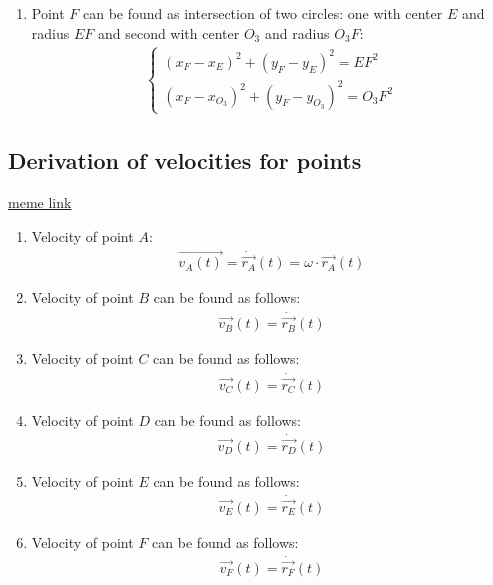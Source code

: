 \begin{enumerate}
    \item Point $F$ can be found as intersection of two circles: one with center $E$ and radius $EF$ and second with center $O_3$ and radius $O_3F$:
          \begin{align}
              \begin{cases}
                  (x_F - x_E)^2 + (y_F - y_E)^2 = EF^2 \\
                  (x_F - x_{O_3})^2 + (y_F - y_{O_3})^2 = O_3F^2
              \end{cases}
          \end{align}


\end{enumerate}

\subsection{Derivation of velocities for points}
\href{https://www.youtube.com/watch?v=l7jCZV_lIHM}{meme link}

\begin{enumerate}
    \item Velocity of point $A$:
          \begin{align}
              \vec{v_A(t)} = \dot{\vec{r_A}}(t) = \omega \cdot \vec{r_A}(t)
          \end{align}

    \item Velocity of point $B$ can be found as follows:
          \begin{align}
              \vec{v_B}(t) = \dot{\vec{r_B}}(t)
          \end{align}
    \item Velocity of point $C$ can be found as follows:
          \begin{align}
              \vec{v_C}(t) = \dot{\vec{r_C}}(t)
          \end{align}

    \item Velocity of point $D$ can be found as follows:
          \begin{align}
              \vec{v_D}(t) = \dot{\vec{r_D}}(t)
          \end{align}

    \item Velocity of point $E$ can be found as follows:
          \begin{align}
              \vec{v_E}(t) = \dot{\vec{r_E}}(t)
          \end{align}

    \item Velocity of point $F$ can be found as follows:
          \begin{align}
              \vec{v_F}(t) = \dot{\vec{r_F}}(t)
          \end{align}



\end{enumerate}

